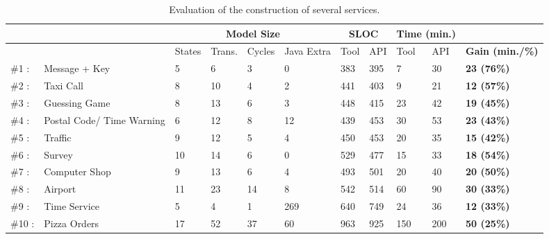 \begin{table}[h]
\centering
\scriptsize
\begin{tabular}{|p{0.7cm}p{2.0cm}||p{0.9cm}|p{0.9cm}|p{0.9cm}|p{0.9cm}||p{0.8cm}|p{0.8cm}||p{0.8cm}|p{0.8cm}||p{1.5cm}|}
\hline
&        		& \multicolumn{4}{|c||}{{\bf Model Size}} & \multicolumn{2}{|c||}{{\bf SLOC}} & \multicolumn{2}{|c||}{{\bf Time (min.)}}  & \\ \hline
&        		& States & Trans.  & Cycles & Java Extra & Tool & API                                     & Tool & API                            & {\bf Gain (min./\%)} \\ \hline
\#1 : & Message + Key  & 5        & 6         & 3        & 0 & 383 & 395 & 7                    &  30            & {\bf 23 (76\%)} \\ \hline
\#2 : & Taxi Call           & 8        & 10       & 4        & 2 & 441 & 403 & 9                    &  21              & {\bf 12 (57\%)} \\ \hline
\#3 : & Guessing Game & 8        & 13       & 6        & 3 & 448 & 415 & 23                  &  42            & {\bf 19 (45\%)} \\ \hline
\#4 : & Postal Code/ Time Warning & 6        & 12       & 8        & 12 & 439 & 453 & 30 &  53          & {\bf 23 (43\%)} \\ \hline
\#5 : & Traffic              & 9      & 12         & 5      & 4 & 450 & 453 & 20                  &  35              &  {\bf 15  (42\%)} \\ \hline
\#6 : & Survey             & 10      & 14       & 6        & 0  & 529 & 477 & 15                  &  33            & {\bf 18 (54\%)} \\ \hline
\#7 : & Computer Shop & 9       & 13         & 6        & 4 & 493 & 501 & 20                  &  40             &  {\bf 20 (50\%)} \\ \hline
\#8 : & Airport             & 11      & 23         & 14      & 8 & 542 & 514 & 60                  &  90             & {\bf 30  (33\%)} \\ \hline
\#9 : & Time Service    & 5        & 4         & 1        & 269 & 640 & 749 & 24                  &  36             & {\bf 12 (33\%)} \\ \hline
\#10 : & Pizza Orders   & 17     & 52         & 37      & 60 & 963 & 925 & 150                &  200            & {\bf 50 (25\%)} \\ \hline
\end{tabular}
\caption{Evaluation of the construction of several services.}
\label{tab:results}
\end{table}

